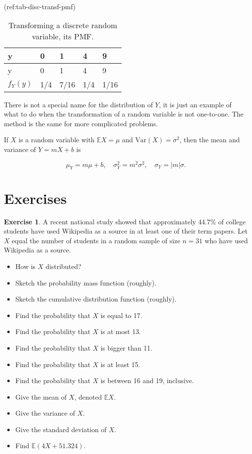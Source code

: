 \documentclass[]{book}
\providecommand{\tightlist}{%
  \setlength{\itemsep}{0pt}\setlength{\parskip}{0pt}}
\numberwithin{equation}{chapter}
\numberwithin{figure}{chapter}
\theoremstyle{plain}
\theoremstyle{definition}
\newtheorem{xca}{Exercise}[chapter]
\theoremstyle{remark}
\theoremstyle{definition}
\theoremstyle{definition}
\theoremstyle{remark}
\let\BeginKnitrBlock\begin \let\EndKnitrBlock\end
\begin{document}
(ref:tab-disc-transf-pmf)

\begin{longtable}[]{@{}lllll@{}}
\caption{Transforming a discrete random variable, its
PMF.}\tabularnewline
\toprule
y & 0 & 1 & 4 & 9\tabularnewline
\midrule
\endfirsthead
\toprule
y & 0 & 1 & 4 & 9\tabularnewline
\midrule
\endhead
\(f_{Y}(y)\) & 1/4 & 7/16 & 1/4 & 1/16\tabularnewline
\bottomrule
\end{longtable}

There is not a special name for the distribution of \(Y\), it is just an
example of what to do when the transformation of a random variable is
not one-to-one. The method is the same for more complicated problems.

\bigskip

\BeginKnitrBlock{proposition}
\protect\hypertarget{prp:unnamed-chunk-246}{}{\label{prp:unnamed-chunk-246}}If
\(X\) is a random variable with \(\mathbb{E} X=\mu\) and
\(\mbox{Var}(X)=\sigma^{2}\), then the mean and variance of \(Y=mX+b\)
is

\begin{equation}
\mu_{Y}=m\mu+b,\quad \sigma_{Y}^{2}=m^{2}\sigma^{2},\quad \sigma_{Y}=|m|\sigma.
\end{equation}
\EndKnitrBlock{proposition}

\section{Exercises}\label{exercises-3}

\begin{xca}
A recent national study showed that approximately 44.7\% of college
students have used Wikipedia as a source in at least one of their term
papers. Let \(X\) equal the number of students in a random sample of
size \(n=31\) who have used Wikipedia as a source.

\begin{itemize}
\tightlist
\item
  How is \(X\) distributed?
\item
  Sketch the probability mass function (roughly).
\item
  Sketch the cumulative distribution function (roughly).
\item
  Find the probability that \(X\) is equal to 17.
\item
  Find the probability that \(X\) is at most 13.
\item
  Find the probability that \(X\) is bigger than 11.
\item
  Find the probability that \(X\) is at least 15.
\item
  Find the probability that \(X\) is between 16 and 19, inclusive.
\item
  Give the mean of \(X\), denoted \(\mathbb{E} X\).
\item
  Give the variance of \(X\).
\item
  Give the standard deviation of \(X\).
\item
  Find \(\mathbb{E}(4X + 51.324)\).
\end{itemize}
\end{xca}
\end{document}
